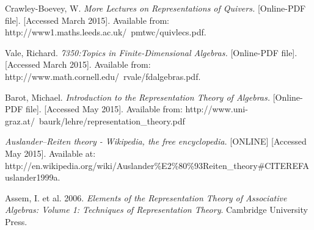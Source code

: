 \documentclass[11.5pt, twoside, a4paper, titlepage]{report}
\theoremstyle{definition}
\theoremstyle{plain}
\begin{document}
\begin{thebibliography}{99}
Crawley-Boevey, W.
\emph{More Lectures on Representations of Quivers.} [Online-PDF file]. [Accessed March 2015].
Available from: http://www1.maths.leeds.ac.uk/~pmtwc/quivlecs.pdf.

Vale, Richard.
\emph{7350:Topics in Finite-Dimensional Algebras.} [Online-PDF file]. [Accessed March 2015].
Available from: http://www.math.cornell.edu/~rvale/fdalgebras.pdf.

Barot, Michael.
\emph{Introduction to the Representation Theory of Algebras.} [Online-PDF file]. [Accessed May 2015].
Available from: http://www.uni-graz.at/~baurk/lehre/representation\_theory.pdf

\emph{Auslander–Reiten theory - Wikipedia, the free encyclopedia.} [ONLINE] [Accessed May 2015].
Available at: http://en.wikipedia.org/wiki/Auslander\%E2\%80\%93Reiten\_theory\#CITEREFAuslander1999a.

Assem, I. et al.
2006. 
\emph{Elements of the Representation Theory of Associative Algebras: Volume 1: Techniques of Representation Theory}.
Cambridge University Press.
\end{thebibliography}
\end{document}
